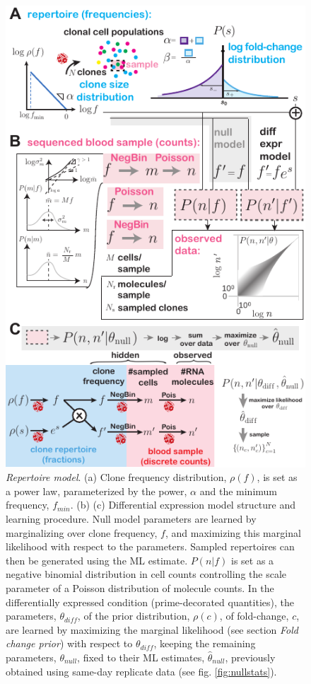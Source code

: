 \documentclass[letterpaper,english,prl,reprint,longbibliography]{revtex4-1} %
\begin{document}
\begin{figure}[ht!]
\includegraphics{fig1_nullmodel_v3}
\centering{}
\caption{
\emph{Repertoire model}. 
(a) Clone frequency distribution, $\rho(f)$, is set as a power law, parameterized by the power, $\alpha$ and the minimum frequency, $f_{min}$.
(b)
(c) Differential expression model structure and learning procedure. Null model parameters are learned by marginalizing over clone frequency, $f$, and maximizing this marginal likelihood with respect to the parameters. Sampled repertoires can then be generated using the ML estimate. $P(n|f)$ is set as a negative binomial distribution in cell counts controlling the scale parameter of a Poisson distribution of molecule counts. In the differentially expressed condition (prime-decorated quantities), the parameters, $\theta_{diff}$, of the prior distribution, $\rho(c)$, of fold-change, $c$, are learned by maximizing the marginal likelihood (see section \textit{Fold change prior}) with respect to $\theta_{diff}$, keeping the remaining parameters, $\theta_{null}$, fixed to their ML estimates, $\hat{\theta}_{null}$, previously obtained using same-day replicate data (see fig. \ref{fig:nullstats}).
\label{fig:fullmodel}}
\end{figure}
\end{document}
